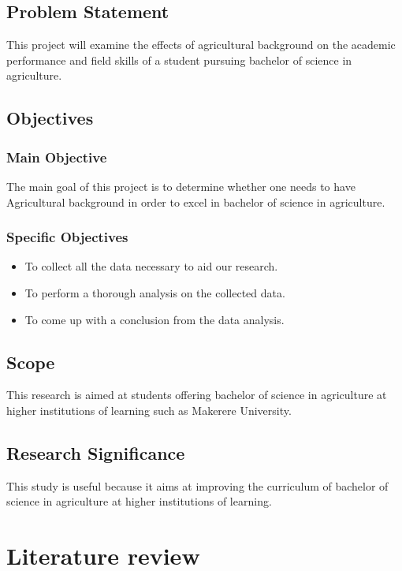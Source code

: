 \documentclass[options]{article}
\begin{document}
\subsection{\textbf{Problem Statement}}
This project will examine the effects of agricultural background on the academic performance and field skills of a student pursuing bachelor of science in agriculture.


\subsection{\textbf{Objectives}}


\subsubsection{\textbf{Main Objective}} 
The main goal of this project is to determine whether one needs to have Agricultural background in order to excel in bachelor of science in agriculture. 


\subsubsection{\textbf{Specific Objectives}}

\begin{itemize}
  \item To collect all the data necessary to aid our research.
  \item To perform a thorough analysis on the collected data.
  \item To come up with a conclusion from the data analysis.
\end{itemize}


\subsection{\textbf{Scope}}
This research is aimed at students offering bachelor of science in agriculture at higher institutions of learning such as Makerere University.

\subsection{\textbf{Research Significance}}
This study is useful because it aims at improving the curriculum of bachelor of science in agriculture at higher institutions of learning.



\section{\textbf{Literature review}}
\end{document}

